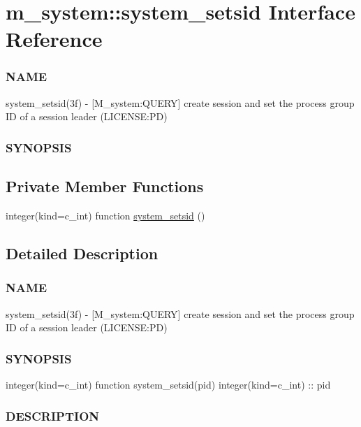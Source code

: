 \hypertarget{interfacem__system_1_1system__setsid}{}\section{m\+\_\+system\+:\+:system\+\_\+setsid Interface Reference}
\label{interfacem__system_1_1system__setsid}


\subsubsection*{N\+A\+ME}

system\+\_\+setsid(3f) -\/ \mbox{[}M\+\_\+system\+:Q\+U\+E\+RY\mbox{]} create session and set the process group ID of a session leader (L\+I\+C\+E\+N\+SE\+:PD) \subsubsection*{S\+Y\+N\+O\+P\+S\+IS} 


\subsection*{Private Member Functions}
\begin{DoxyCompactItemize}
\item 
integer(kind=c\+\_\+int) function \mbox{\hyperlink{interfacem__system_1_1system__setsid_a3368836e902ccbf8e0418c56f18e2df3}{system\+\_\+setsid}} ()
\end{DoxyCompactItemize}


\subsection{Detailed Description}
\subsubsection*{N\+A\+ME}

system\+\_\+setsid(3f) -\/ \mbox{[}M\+\_\+system\+:Q\+U\+E\+RY\mbox{]} create session and set the process group ID of a session leader (L\+I\+C\+E\+N\+SE\+:PD) \subsubsection*{S\+Y\+N\+O\+P\+S\+IS}

integer(kind=c\+\_\+int) function system\+\_\+setsid(pid) integer(kind=c\+\_\+int) \+:\+: pid \subsubsection*{D\+E\+S\+C\+R\+I\+P\+T\+I\+ON}


